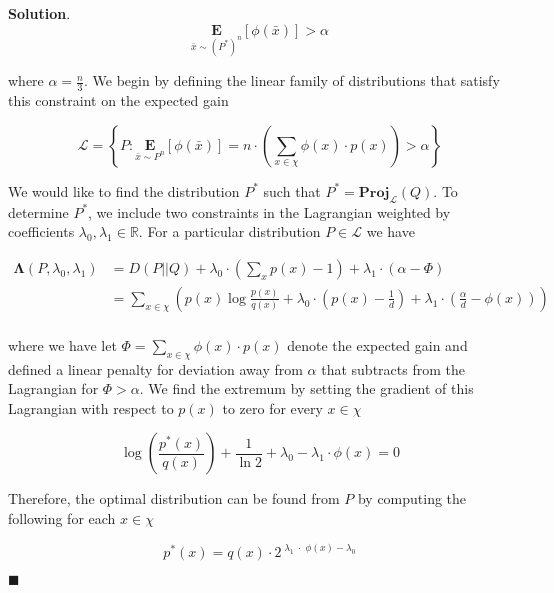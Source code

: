 \documentclass[12pt]{article}
\theoremstyle{definition}
\newenvironment{s}{%
        \begin{trivlist} \item \textbf{Solution}. }{%
            \hspace*{\fill} $\blacksquare$\end{trivlist}}%
\begin{document}
{\begin{s}
\begin{equation*}
\underset{\bar{x} \sim (P^{*})^{n}}{\mathbf E}\left[\phi(\bar{x})\right] > \alpha
\end{equation*}

where $\alpha =  \frac{n}{3}$. We begin by defining the linear family of distributions that satisfy this constraint on the expected gain

\begin{equation*}
\mathcal{L} = \left\{ P : \underset{\bar{x} \sim P^{n}}{\mathbf E}\left[\phi(\bar{x})\right] = 
n\cdot\left(\sum_{x\in \chi} \phi(x)\cdot p(x)\right) > \alpha \right\}
\end{equation*}

We would like to find the distribution $P^{*}$ such that $P^{*} = \mathbf{Proj}_{\mathcal{L}}(Q)$. To determine $P^{*}$, we include two constraints in the Lagrangian weighted by coefficients $\lambda_{0},\lambda_{1}\in \mathbb{R}$. For a particular distribution $P \in \mathcal{L}$ we have 

\begin{align*}
\mathbf{\Lambda}(P, \lambda_{0}, \lambda_{1}) &= D(P||Q) + \lambda_{0}\cdot \left(\sum_{x} p(x) - 1\right) + \lambda_{1}\cdot (\alpha-\Phi)\\
&= \sum_{x\in \chi} \left(p(x)\log\frac{p(x)}{q(x)} + \lambda_{0}\cdot \left(p(x) - \frac{1}{d}\right) + \lambda_{1}\cdot \left(\frac{\alpha}{d}-\phi(x)\right)\right)\\
\end{align*}

where we have let $\Phi = \sum_{x \in \chi} \phi(x)\cdot p(x)$ denote the expected gain and defined a linear penalty for deviation away from $\alpha$ that subtracts from the Lagrangian for $\Phi > \alpha$. We find the extremum by setting the gradient of this Lagrangian with respect to $p(x)$ to zero for every $x\in \chi$

\begin{equation*}
\log\left(\frac{p^{*}(x)}{q(x)}\right) + \frac{1}{\ln 2} + \lambda_{0} -\lambda_{1}\cdot \phi(x) = 0
\end{equation*}

Therefore, the optimal distribution can be found from $P$ by computing the following for each $x\in \chi$

\begin{equation*}
p^{*}(x) = q(x)\cdot 2^{\; \lambda_{1}\;\cdot\; \phi(x) - \lambda_{0}}
\end{equation*}


\end{s}}
\end{document}
